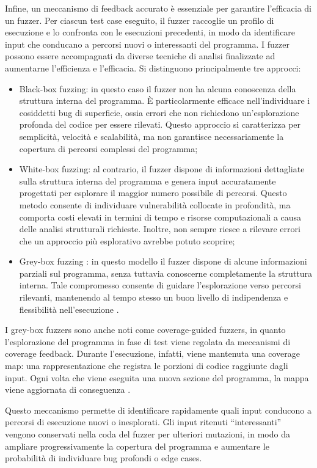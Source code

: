 Infine, un meccanismo di feedback accurato è essenziale per garantire l’efficacia di un fuzzer. Per ciascun test case eseguito, il fuzzer raccoglie un profilo di esecuzione e lo confronta con le esecuzioni precedenti, in modo da identificare input che conducano a percorsi nuovi o interessanti del programma. I fuzzer possono essere accompagnati da diverse tecniche di analisi finalizzate ad aumentarne l’efficienza e l’efficacia. Si distinguono principalmente tre approcci: 
\begin{itemize}
    \item Black-box fuzzing: in questo caso il fuzzer non ha alcuna conoscenza della struttura interna del programma. È particolarmente efficace nell’individuare i cosiddetti bug di superficie, ossia errori che non richiedono un’esplorazione profonda del codice per essere rilevati. Questo approccio si caratterizza per semplicità, velocità e scalabilità, ma non garantisce necessariamente la copertura di percorsi complessi del programma;
    \item White-box fuzzing: al contrario, il fuzzer dispone di informazioni dettagliate sulla struttura interna del programma e genera input accuratamente progettati per esplorare il maggior numero possibile di percorsi. Questo metodo consente di individuare vulnerabilità collocate in profondità, ma comporta costi elevati in termini di tempo e risorse computazionali a causa delle analisi strutturali richieste. Inoltre, non sempre riesce a rilevare errori che un approccio più esplorativo avrebbe potuto scoprire;
    \item Grey-box fuzzing : in questo modello il fuzzer dispone di alcune informazioni parziali sul programma, senza tuttavia conoscerne completamente la struttura interna. Tale compromesso consente di guidare l’esplorazione verso percorsi rilevanti, mantenendo al tempo stesso un buon livello di indipendenza e flessibilità nell’esecuzione \cite{ref22}.
\end{itemize}

I grey-box fuzzers sono anche noti come coverage-guided fuzzers, in quanto l’esplorazione del programma in fase di test viene regolata da meccanismi di coverage feedback. Durante l’esecuzione, infatti, viene mantenuta una coverage map: una rappresentazione che registra le porzioni di codice raggiunte dagli input. Ogni volta che viene eseguita una nuova sezione del programma, la mappa viene aggiornata di conseguenza \cite{ref23}.

Questo meccanismo permette di identificare rapidamente quali input conducono a percorsi di esecuzione nuovi o inesplorati. Gli input ritenuti “interessanti” vengono conservati nella coda del fuzzer per ulteriori mutazioni, in modo da ampliare progressivamente la copertura del programma e aumentare le probabilità di individuare bug profondi o edge cases.

